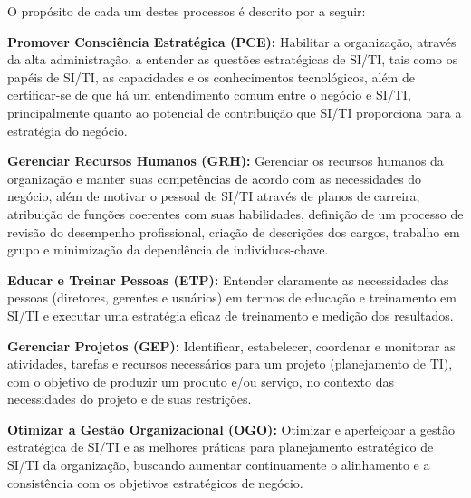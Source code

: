 O propósito de cada um destes processos é descrito por  a seguir:


\textbf{Promover Consciência Estratégica (PCE):} Habilitar a organização, através da alta administração, a entender as questões estratégicas de SI/TI, tais como os papéis de SI/TI, as capacidades e os conhecimentos tecnológicos, além de certificar-se de que há um entendimento comum entre o negócio e SI/TI, principalmente quanto ao potencial de contribuição que SI/TI proporciona para a estratégia do negócio.


\textbf{Gerenciar Recursos Humanos (GRH):} Gerenciar os recursos humanos da organização e manter suas competências de acordo com as necessidades do negócio, além de motivar o pessoal de SI/TI através de planos de carreira, atribuição de funções coerentes com suas habilidades, definição de um processo de revisão do desempenho profissional, criação de descrições dos cargos, trabalho em grupo e minimização da dependência de indivíduos-chave.

\textbf{Educar e Treinar Pessoas (ETP):} Entender claramente as necessidades das pessoas (diretores, gerentes e usuários) em termos de educação e treinamento em SI/TI e executar uma estratégia eficaz de treinamento e medição dos resultados.

\textbf{Gerenciar Projetos (GEP):} Identificar, estabelecer, coordenar e monitorar as atividades, tarefas e recursos necessários para um projeto (planejamento de TI), com o objetivo de produzir um produto e/ou serviço, no contexto das necessidades do projeto e de suas restrições.

\textbf{Otimizar a Gestão Organizacional (OGO):} Otimizar e aperfeiçoar a gestão estratégica de SI/TI e as melhores práticas para planejamento estratégico de SI/TI da organização, buscando aumentar continuamente o alinhamento e a consistência com os objetivos estratégicos de negócio.


